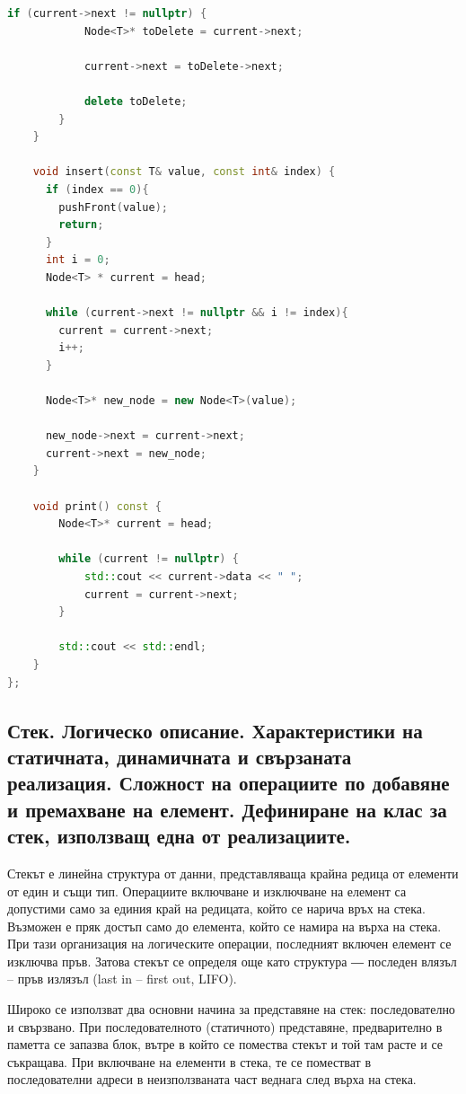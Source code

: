 \documentclass{article}
\renewcommand{\\}{\newline}
\begin{document}
\begin{lstlisting}[language=C++]
        if (current->next != nullptr) {
            Node<T>* toDelete = current->next;

            current->next = toDelete->next;

            delete toDelete;
        }
    }

    void insert(const T& value, const int& index) {
      if (index == 0){
        pushFront(value);
        return;
      }
      int i = 0;
      Node<T> * current = head;

      while (current->next != nullptr && i != index){
        current = current->next;
        i++;
      }
      
      Node<T>* new_node = new Node<T>(value);

      new_node->next = current->next;
      current->next = new_node;
    }

    void print() const {
        Node<T>* current = head;

        while (current != nullptr) {
            std::cout << current->data << " ";
            current = current->next;
        }

        std::cout << std::endl;
    }
};
\end{lstlisting}
\subsection{Стек. Логическо описание. Характеристики на статичната, динамичната и свързаната реализация. Сложност на операциите по добавяне и премахване на елемент. Дефиниране на клас за стек, използващ една от реализациите.}

Стекът е линейна структура от данни, представляваща крайна редица от елементи от един и същи тип. Операциите включване и изключване на елемент са допустими само за единия край на редицата, който се нарича връх на стека. Възможен е пряк достъп само до елемента, който се намира на върха на стека. При тази организация на логическите операции, последният включен елемент се изключва пръв. Затова стекът се определя още като структура ― последен влязъл – пръв излязъл (last in – first out, LIFO).

Широко се използват два основни начина за представяне на стек: последователно и свързвано. При последователното (статичното) представяне, предварително в паметта се запазва блок, вътре в който се помества стекът и той там расте и се съкращава. При включване на елементи в стека, те се поместват в последователни адреси в неизползваната част веднага след върха на стека.
\end{document}
